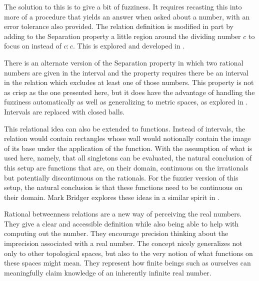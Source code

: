 \documentclass[12pt]{article}
\begin{document}
The solution to this is to give a bit of fuzziness. It requires recasting this into more of a procedure that yields an answer when asked about a number, with an error tolerance also provided. The relation definition is modified in part by adding to the Separation property a little region around the dividing number $c$ to focus on instead of $c:c$. This is explored and developed in \cite{taylor23main}.

There is an alternate version of the Separation property in which two rational numbers are given in the interval and the property requires there be an interval in the relation which excludes at least one of those numbers. This property is not as crisp as the one presented here, but it does have the advantage of handling the fuzziness automatically as well as generalizing to metric spaces, as explored in \cite{taylor23metric}. Intervals are replaced with closed balls. 

This relational idea can also be extended to functions. Instead of intervals, the relation would contain rectangles whose wall would notionally contain the image of its base under the application of the function. With the assumption of what is used here, namely, that all singletons can be evaluated, the natural conclusion of this setup are functions that are, on their domain, continuous on the irrationals but potentially discontinuous on the rationals. For the fuzzier version of this setup, the natural conclusion is that these functions need to be continuous on their domain. Mark Bridger explores  these ideas in a similar spirit in \cite{bridger}.

Rational betweenness relations are a new way of perceiving the real numbers. They give a clear and accessible definition while also being able to help with computing out the number. They encourage precision thinking about the imprecision associated with a real number. The concept nicely generalizes not only to other topological spaces, but also to the very notion of what functions on these spaces might mean. They represent how finite beings such as ourselves can meaningfully claim knowledge of an inherently infinite real number. 


\medskip

\normalem %
\printbibliography
\end{document}
